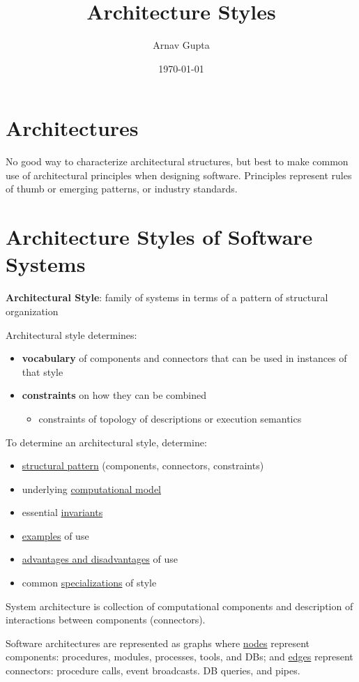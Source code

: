 \documentclass[11pt]{article}
\author{Arnav Gupta}
\date{\today}
\title{Architecture Styles}
\begin{document}
\maketitle
\tableofcontents

\section{Architectures}
\label{sec:org396ec11}
No good way to characterize architectural structures, but best to make common use of architectural
principles when designing software.
Principles represent rules of thumb or emerging patterns, or industry standards.
\section{Architecture Styles of Software Systems}
\label{sec:org7901bfc}
\textbf{Architectural Style}: family of systems in terms of a pattern of structural organization

Architectural style determines:
\begin{itemize}
\item \textbf{vocabulary} of components and connectors that can be used in instances of that style
\item \textbf{constraints} on how they can be combined
\begin{itemize}
\item constraints of topology of descriptions or execution semantics
\end{itemize}
\end{itemize}

To determine an architectural style, determine:
\begin{itemize}
\item \uline{structural pattern} (components, connectors, constraints)
\item underlying \uline{computational model}
\item essential \uline{invariants}
\item \uline{examples} of use
\item \uline{advantages and disadvantages} of use
\item common \uline{specializations} of style
\end{itemize}

System architecture is collection of computational components and description of interactions between
components (connectors).

Software architectures are represented as graphs where \uline{nodes} represent components: procedures, modules,
processes, tools, and DBs; and \uline{edges} represent connectors: procedure calls, event broadcasts.
DB queries, and pipes.
\end{document}
